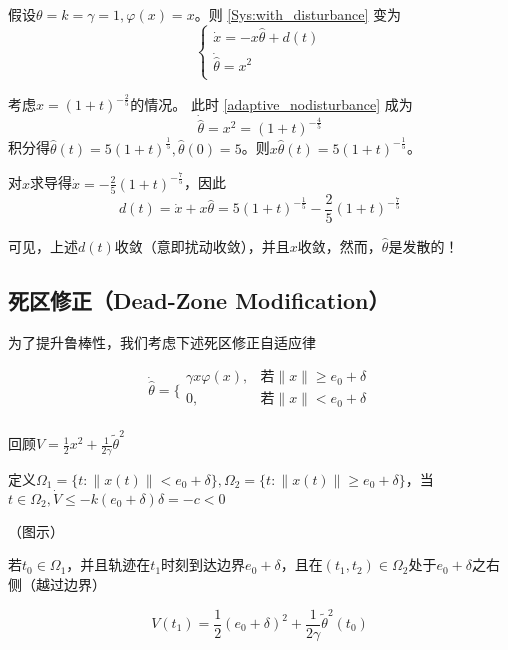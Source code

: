 \begin{example}[扰动衰减但参数估计发散]
    假设\(\theta = k = \gamma = 1,\varphi(x) = x\)。则 \eqref{Sys:with_disturbance} 变为
\[\begin{cases}
\dot{x} = - x\hat{\theta} + d(t) \\
\dot{\hat{\theta}} = x^{2} \\
\end{cases}\]

考虑$x = (1 + t)^{- \frac{2}{5}} $的情况。
此时 \eqref{adaptive_nodisturbance} 成为
\[\dot{\hat{\theta}} = x^{2} = (1 + t)^{- \frac{4}{5}} \]
积分得$\hat{\theta}(t) = 5(1 + t)^{\frac{1}{5}},\hat{\theta}(0) = 5$。则\(x\hat{\theta}(t) = 5(1 + t)^{- \frac{1}{5}}\)。

对$x$求导得$\dot{x} = - \frac{2}{5}(1 + t)^{- \frac{7}{5}}$，因此
\[d(t) = \dot{x} + x\hat{\theta} = 5(1 + t)^{- \frac{1}{5}} - \frac{2}{5}(1 + t)^{- \frac{7}{5}}\]

可见，上述\(d(t)\)收敛（意即扰动收敛），并且\(x\)收敛，然而，\(\hat{\theta}\)是发散的！
\end{example}

\subsection{死区修正（Dead-Zone Modification）}

为了提升鲁棒性，我们考虑下述死区修正自适应律

\[\dot{\hat{\theta}} = \{\begin{matrix}
\gamma x\varphi(x), & \text{若} \parallel x \parallel \geq e_{0} + \delta \\
0, & \text{若} \parallel x \parallel < e_{0} + \delta \\
\end{matrix}\]

回顾\(V = \frac{1}{2}x^{2} + \frac{1}{2\gamma}{\tilde{\theta}}^{2}\)

定义\(\Omega_{1} = \{ t: \parallel x(t) \parallel < e_{0} + \delta\},\Omega_{2} = \{ t: \parallel x(t) \parallel \geq e_{0} + \delta\}\)，当\(t \in \Omega_{2},\dot{V} \leq - k(e_{0} + \delta)\delta = - c < 0\)

（图示）

若\(t_{0} \in \Omega_{1}\)，并且轨迹在\(t_{1}\)时刻到达边界\(e_{0} + \delta\)，且在\((t_{1},t_{2}) \in \Omega_{2}\)处于\(e_{0} + \delta\)之右侧（越过边界）

\[V(t_{1}) = \frac{1}{2}(e_{0} + \delta)^{2} + \frac{1}{2\gamma}{\tilde{\theta}}^{2}(t_{0})\]


